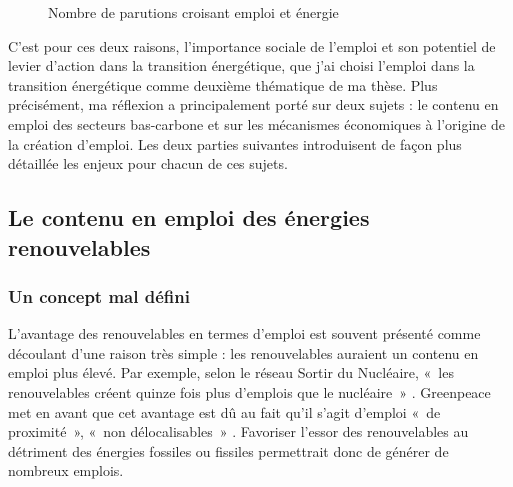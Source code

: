 \begin{figure}[h!]
	\centering
	 \qquad
	\caption{Nombre de parutions croisant emploi et énergie}
\end{figure}

C’est pour ces deux raisons, l’importance sociale de l’emploi et son potentiel de levier d’action dans la transition énergétique, que j’ai choisi l’emploi dans la transition énergétique comme deuxième thématique de ma thèse.
Plus précisément, ma réflexion a principalement porté sur deux sujets : le contenu en emploi des secteurs bas-carbone et sur les mécanismes économiques à l'origine de la création d'emploi. 
Les deux parties suivantes introduisent de façon plus détaillée les enjeux pour chacun de ces sujets.


\subsection{Le contenu en emploi des énergies renouvelables}

\subsubsection{Un concept mal défini}
L’avantage des renouvelables en termes d’emploi est souvent présenté comme découlant d'une raison très simple : les renouvelables auraient un contenu en emploi plus élevé. Par exemple, selon le réseau Sortir du Nucléaire, «~les renouvelables créent quinze fois plus d’emplois que le nucléaire~» \citep{Les7ventsduCotentin2009}. Greenpeace met en avant que cet avantage est dû au fait qu’il s’agit d’emploi «~de proximité~», «~non délocalisables~» \citep{Greenpeace2011}. Favoriser l’essor des renouvelables au détriment des énergies fossiles ou fissiles permettrait donc de générer de nombreux emplois.


